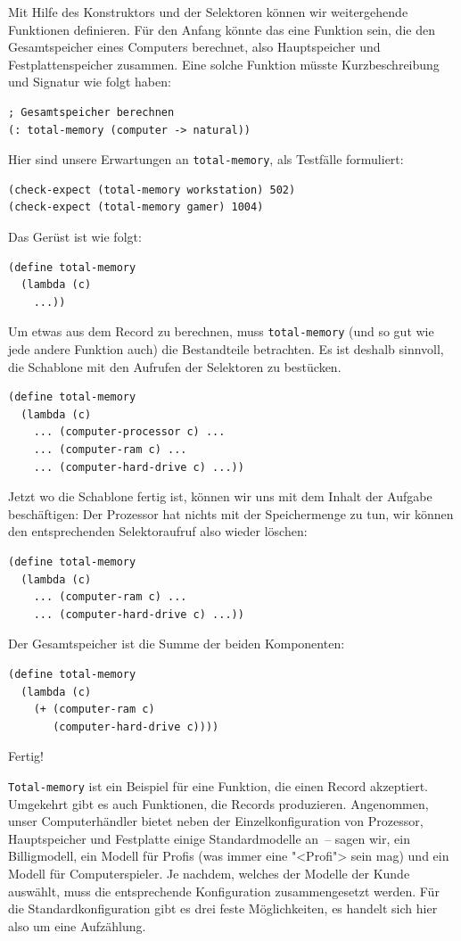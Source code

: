Mit Hilfe des Konstruktors und der Selektoren können wir weitergehende
Funktionen definieren.
Für den Anfang könnte das
eine Funktion sein, die den Gesamtspeicher eines Computers berechnet,
also Hauptspeicher und Festplattenspeicher zusammen.
Eine solche Funktion müsste Kurzbeschreibung und Signatur wie folgt
haben: 
%
\begin{lstlisting}
; Gesamtspeicher berechnen
(: total-memory (computer -> natural))
\end{lstlisting}
%
Hier sind unsere Erwartungen an \lstinline{total-memory}, als Testfälle
formuliert:
%
\begin{lstlisting}
(check-expect (total-memory workstation) 502)
(check-expect (total-memory gamer) 1004)
\end{lstlisting}
% 
Das Gerüst ist wie folgt:
%
\begin{lstlisting}
(define total-memory
  (lambda (c)
    ...))
\end{lstlisting}
%
Um etwas aus dem Record zu berechnen, muss \lstinline{total-memory} (und
so gut wie jede andere Funktion auch) die Bestandteile betrachten.  Es
ist deshalb sinnvoll, die Schablone mit den Aufrufen der Selektoren zu
bestücken.
%
\begin{lstlisting}
(define total-memory
  (lambda (c)
    ... (computer-processor c) ...
    ... (computer-ram c) ...
    ... (computer-hard-drive c) ...))
\end{lstlisting}
%
Jetzt wo die Schablone fertig ist, können wir uns mit dem Inhalt der
Aufgabe beschäftigen: Der Prozessor hat nichts mit der
Speichermenge zu tun, wir können den entsprechenden Selektoraufruf
also wieder löschen:
%
\begin{lstlisting}
(define total-memory
  (lambda (c)
    ... (computer-ram c) ...
    ... (computer-hard-drive c) ...))
\end{lstlisting}
%
Der Gesamtspeicher ist die Summe der beiden Komponenten:
%
\begin{lstlisting}
(define total-memory
  (lambda (c)
    (+ (computer-ram c)
       (computer-hard-drive c))))
\end{lstlisting}
%
Fertig!

\lstinline{Total-memory} ist ein Beispiel für eine Funktion, die einen
Record akzeptiert.  Umgekehrt gibt es auch Funktionen, die Records
produzieren.  Angenommen, unser Computerhändler bietet neben der
Einzelkonfiguration von Prozessor, Hauptspeicher und Festplatte einige
Standardmodelle an~-- sagen wir, ein Billigmodell, ein Modell für
Profis (was immer eine "<Profi"> sein mag) und ein Modell für
Computerspieler.  Je nachdem, welches der Modelle der Kunde auswählt,
muss die entsprechende Konfiguration zusammengesetzt werden.  Für die
Standardkonfiguration gibt es drei feste Möglichkeiten, es handelt
sich hier also um eine Aufzählung.

